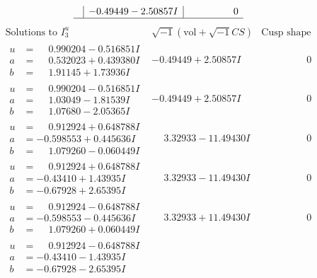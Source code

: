 \documentclass[1p]{elsarticle_modified}
\theoremstyle{definition}
\newcommand{\I}{\sqrt{-1}}
\begin{document}
$$\begin{array}{c|c|c}
 & -0.49449 - 2.50857 I & \phantom{-0.000000 } 0\\
 \hline 
 \end{array}$$\newpage$$\begin{array}{c|c|c}  
\text{Solutions to }I^u_{3}& \I (\text{vol} + \sqrt{-1}CS) & \text{Cusp shape}\\
 \hline 
\begin{aligned}
u &= \phantom{-}0.990204 - 0.516851 I \\
a &= \phantom{-}0.532023 + 0.439380 I \\
b &= \phantom{-}1.91145 + 1.73936 I\end{aligned}
 & -0.49449 + 2.50857 I & \phantom{-0.000000 } 0 \\ \hline\begin{aligned}
u &= \phantom{-}0.990204 - 0.516851 I \\
a &= \phantom{-}1.03049 - 1.81539 I \\
b &= \phantom{-}1.07680 - 2.05365 I\end{aligned}
 & -0.49449 + 2.50857 I & \phantom{-0.000000 } 0 \\ \hline\begin{aligned}
u &= \phantom{-}0.912924 + 0.648788 I \\
a &= -0.598553 + 0.445636 I \\
b &= \phantom{-}1.079260 - 0.060449 I\end{aligned}
 & \phantom{-}3.32933 - 11.49430 I & \phantom{-0.000000 } 0 \\ \hline\begin{aligned}
u &= \phantom{-}0.912924 + 0.648788 I \\
a &= -0.43410 + 1.43935 I \\
b &= -0.67928 + 2.65395 I\end{aligned}
 & \phantom{-}3.32933 - 11.49430 I & \phantom{-0.000000 } 0 \\ \hline\begin{aligned}
u &= \phantom{-}0.912924 - 0.648788 I \\
a &= -0.598553 - 0.445636 I \\
b &= \phantom{-}1.079260 + 0.060449 I\end{aligned}
 & \phantom{-}3.32933 + 11.49430 I & \phantom{-0.000000 } 0 \\ \hline\begin{aligned}
u &= \phantom{-}0.912924 - 0.648788 I \\
a &= -0.43410 - 1.43935 I \\
b &= -0.67928 - 2.65395 I\end{aligned}

\end{array}$$
\end{document}
